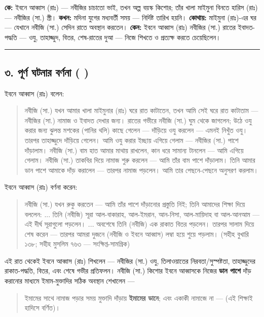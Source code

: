\textbf{কে:} ইবনে আব্বাস (রাঃ) — নবীজির চাচাতো ভাই, তখন অল্প বয়স্ক কিশোর; তাঁর খালা মাইমুনা বিনতে হারিস (রাঃ) — নবীজির (সা.) স্ত্রী।
\textbf{কখন:} মদিনা যুগের মধ্যবর্তী সময় — নির্দিষ্ট তারিখ হয়নি।
\textbf{কোথায়:} মাইমুনা (রাঃ)-এর ঘর — যেখানে নবীজি (সা.) সেদিন রাতে অবস্থান করতেন।
\textbf{কেন:} ইবনে আব্বাস (রাঃ) নবীজির (সা.) রাতের ইবাদত-পদ্ধতি — ওযু, তাহাজ্জুদ, বিতর, শেষ-রাতের দুআ — নিজে শিখতে ও প্রত্যক্ষ করতে চেয়েছিলেন।

\medskip\hrule\medskip

\subsection*{৩. পূর্ণ ঘটনার বর্ণনা (  )}

ইবনে আব্বাস (রাঃ) বলেন:

\begin{quote}
নবীজি (সা.) যখন আমার খালা মাইমুনার (রাঃ) ঘরে রাত কাটাতেন, তখন আমি সেই ঘরে রাত কাটাতাম — নবীজির (সা.) নামাজ ও ইবাদত দেখার জন্য। রাতের গভীরে নবীজি (সা.) ঘুম থেকে জাগলেন; উঠে ওযু করার জন্য ঝুলন্ত মশকের (পানির থলি) কাছে গেলেন — দাঁড়িয়ে ওযু করলেন — এমনই নিখুঁত ওযু। তারপর তাহাজ্জুদে দাঁড়িয়ে গেলেন। আমি ওযু করার ইচ্ছায় এগিয়ে গেলাম — নবীজির (সা.) পাশে দাঁড়ালাম। নবীজি (সা.) বাম হাত আমার মাথায় রাখলেন, কান ধরে সামান্য টানলেন — আমি এগিয়ে গেলাম। নবীজি (সা.) তাকবির দিয়ে নামাজ শুরু করলেন — আমি তাঁর বাম পাশে দাঁড়ালাম। তিনি আমার ডান পাশে আমাকে দাঁড় করালেন — তারপর নামাজ পড়লেন। আমি তার পেছনে-পেছনে অনুসরণ করলাম।
\end{quote}

ইবনে আব্বাস (রাঃ) বর্ণনা করেন:

\begin{quote}
নবীজি (সা.) যখন রুকু করতেন — আমি তাঁর পাশে দাঁড়ানোর প্রস্তুতি নিই; তিনি আমাদের শিক্ষা দিয়ে বললেন: ... তিনি (নবীজি) সূরা আল-বাকারাহ, আল-ইমরান, আন-নিসা, আল-মায়িদাহ বা আল-আনআম — এই দীর্ঘ সূরাগুলো পড়লেন। ... অবশেষে তিনি (নবীজি) এক রাকাত বিতর পড়লেন। তারপর সালাম দিয়ে শেষ করেন — তারপর আমরা দুজনে (নবীজি ও ইবনে আব্বাস) লম্বা হয়ে শুয়ে পড়লাম। (সহীহ বুখারি ১৩৮; সহীহ মুসলিম ৭৬৩ — সংক্ষিপ্ত-সামগ্রিক)
\end{quote}

এই রাত থেকেই ইবনে আব্বাস (রাঃ) শিখলেন — নবীজির (সা.) ওযু, তিলাওয়াতের নিরবতা/সুস্পষ্টতা, তাহাজ্জুদের রাকাত-পদ্ধতি, বিতর, এবং শেষে গভীর প্রতিফলন। নবীজি (সা.) কিশোর ইবনে আব্বাসকে নিজের \textbf{ডান পাশে} দাঁড় করানোর মাধ্যমে ইমাম-মুক্তাদির সঠিক অবস্থান শেখালেন —

\begin{quote}
ইমামের সাথে নামাজ পড়ার সময় মুক্তাদি দাঁড়ায় \textbf{ইমামের ডানে}; এবং একাকী নামাজে না — (এই শিক্ষাই হাদিসে বর্ণিত)।
\end{quote}

